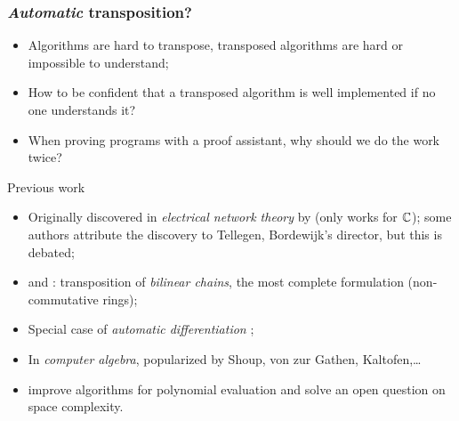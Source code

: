 \documentclass[10pt,usepdftitle=false]{beamer}
\begin{document}

\begin{frame}
  \frametitle{\emph{Automatic} transposition?}

  \begin{itemize}
  \item Algorithms are hard to transpose, transposed algorithms are
    hard or impossible to understand;
  \item How to be confident that a transposed algorithm is well
    implemented if no one understands it?
  \item When proving programs with a proof assistant, why should we do
    the work twice?
  \end{itemize}

  \begin{block}{Previous work}
    \begin{itemize}
    \item Originally discovered in \emph{electrical network theory} by
      \cite{bordewijk57} (only works for $\mathbb{C}$); some authors attribute
      the discovery to Tellegen, Bordewijk's director, but this is
      debated;
    \item \cite{fiduccia:phd} and \cite{hopcroft+musinski73}:
      transposition of \emph{bilinear chains}, the most complete
      formulation (non-commutative rings);
    \item Special case of \emph{automatic differentiation}
      \cite{baur+strassen83};
    \item In \emph{computer algebra}, popularized by Shoup, von zur
      Gathen, Kaltofen,\dots
    \item \cite{bostan+lecerf+schost:tellegen} improve algorithms for
      polynomial evaluation and solve an open question on space
      complexity.
    \end{itemize}
  \end{block}
\end{frame}




      
\end{document}
